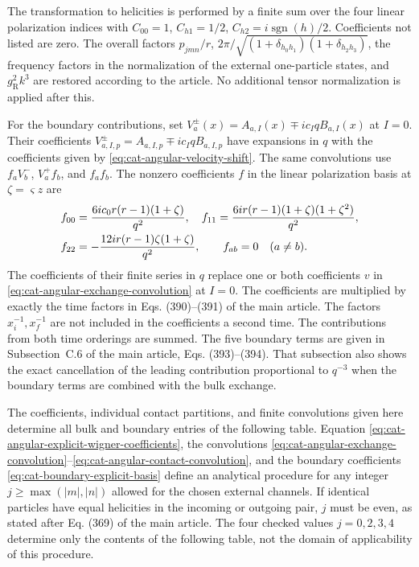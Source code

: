 \documentclass[11pt,a4paper]{article}
\begin{document}
The transformation to helicities is performed by a finite sum over the four linear polarization indices with $C_{00}=1$, $C_{h1}=1/2$, $C_{h2}=i\operatorname{sgn}(h)/2$. Coefficients not listed are zero. The overall factors $p_{jmn}/r$, $2\pi/\sqrt{(1+\delta_{h_0h_1})(1+\delta_{h_2h_3})}$, the frequency factors in the normalization of the external one-particle states, and $g_{\mathrm R}^2k^3$ are restored according to the article. No additional tensor normalization is applied after this.

For the boundary contributions, set $V_a^\pm(x)=A_{a,I}(x)\mp ic_IqB_{a,I}(x)$ at $I=0$. Their coefficients $V_{a,I,p}^\pm=A_{a,I,p}\mp ic_IqB_{a,I,p}$ have expansions in $q$ with the coefficients given by \eqref{eq:cat-angular-velocity-shift}. The same convolutions use $f_a V_b^-$, $V_a^+f_b$, and $f_af_b$. The nonzero coefficients $f$ in the linear polarization basis at $\zeta=\varsigma z$ are
\begin{equation}
\shortstack[l]{
$\displaystyle f_{00}=\frac{6ic_0r(r-1)(1+\zeta)}{q^2},\quad
 f_{11}=\frac{6ir(r-1)(1+\zeta)(1+\zeta^2)}{q^2},$\\
$\displaystyle f_{22}=-\frac{12ir(r-1)\zeta(1+\zeta)}{q^2},\qquad f_{ab}=0\quad(a\ne b).$}
\label{eq:cat-boundary-explicit-basis}
\end{equation}
The coefficients of their finite series in $q$ replace one or both coefficients $v$ in \eqref{eq:cat-angular-exchange-convolution} at $I=0$. The coefficients are multiplied by exactly the time factors in Eqs. (390)--(391) of the main article. The factors $x_i^{-1},x_f^{-1}$ are not included in the coefficients a second time. The contributions from both time orderings are summed. The five boundary terms are given in Subsection~C.6 of the main article, Eqs. (393)--(394). That subsection also shows the exact cancellation of the leading contribution proportional to $q^{-3}$ when the boundary terms are combined with the bulk exchange.

The coefficients, individual contact partitions, and finite convolutions given here determine all bulk and boundary entries of the following table. Equation \eqref{eq:cat-angular-explicit-wigner-coefficients}, the convolutions \eqref{eq:cat-angular-exchange-convolution}--\eqref{eq:cat-angular-contact-convolution}, and the boundary coefficients \eqref{eq:cat-boundary-explicit-basis} define an analytical procedure for any integer $ j\geq\max(|m|,|n|) $ allowed for the chosen external channels. If identical particles have equal helicities in the incoming or outgoing pair, $ j $ must be even, as stated after Eq. (369) of the main article. The four checked values $ j=0,2,3,4 $ determine only the contents of the following table, not the domain of applicability of this procedure.
\end{document}
